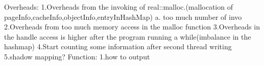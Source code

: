 Overheads:
    1.Overheads from the invoking of real::malloc.(mallocation of pageInfo,cacheInfo,objectInfo,entryInHashMap)
        a. too much number of invo
    2.Overheads from too much memory access in the malloc function
    3.Overheads in the handle access is higher after the program running a while(imbalance in the hashmap)
    4.Start counting some information after second thread writing
    5.shadow mapping?
Function:
    1.how to output